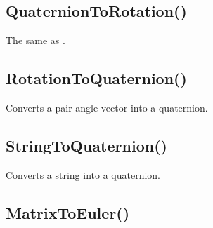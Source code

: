 \documentclass[letterpaper,10pt,english]{sphinxmanual}
\begin{document}
\subsection{QuaternionToRotation()}
\label{functions:quaterniontorotation}

\begin{fulllineitems}
\label{functions:QuaternionToRotation}
\end{fulllineitems}


The same as .


\subsection{RotationToQuaternion()}
\label{functions:rotationtoquaternion}

\begin{fulllineitems}
\label{functions:RotationToQuaternion}
\end{fulllineitems}


Converts a pair angle-vector into a quaternion.


\subsection{StringToQuaternion()}
\label{functions:stringtoquaternion}

\begin{fulllineitems}
\label{functions:StringToQuaternion}
\end{fulllineitems}


Converts a string into a quaternion.


\subsection{MatrixToEuler()}
\label{functions:matrixtoeuler}

\begin{fulllineitems}
\label{functions:MatrixToEuler}
\end{fulllineitems}
\end{document}

